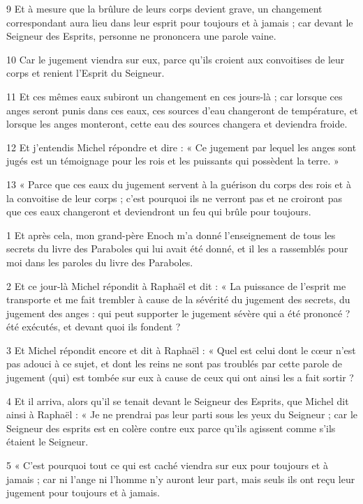 \par 9 Et à mesure que la brûlure de leurs corps devient grave, un changement correspondant aura lieu dans leur esprit pour toujours et à jamais ; car devant le Seigneur des Esprits, personne ne prononcera une parole vaine.
\par 10 Car le jugement viendra sur eux, parce qu'ils croient aux convoitises de leur corps et renient l'Esprit du Seigneur.
\par 11 Et ces mêmes eaux subiront un changement en ces jours-là ; car lorsque ces anges seront punis dans ces eaux, ces sources d'eau changeront de température, et lorsque les anges monteront, cette eau des sources changera et deviendra froide.
\par 12 Et j'entendis Michel répondre et dire : « Ce jugement par lequel les anges sont jugés est un témoignage pour les rois et les puissants qui possèdent la terre. »
\par 13 « Parce que ces eaux du jugement servent à la guérison du corps des rois et à la convoitise de leur corps ; c’est pourquoi ils ne verront pas et ne croiront pas que ces eaux changeront et deviendront un feu qui brûle pour toujours.


\par 1 Et après cela, mon grand-père Enoch m'a donné l'enseignement de tous les secrets du livre des Paraboles qui lui avait été donné, et il les a rassemblés pour moi dans les paroles du livre des Paraboles.
\par 2 Et ce jour-là Michel répondit à Raphaël et dit : « La puissance de l'esprit me transporte et me fait trembler à cause de la sévérité du jugement des secrets, du jugement des anges : qui peut supporter le jugement sévère qui a été prononcé ? été exécutés, et devant quoi ils fondent ?
\par 3 Et Michel répondit encore et dit à Raphaël : « Quel est celui dont le cœur n'est pas adouci à ce sujet, et dont les reins ne sont pas troublés par cette parole de jugement (qui) est tombée sur eux à cause de ceux qui ont ainsi les a fait sortir ?
\par 4 Et il arriva, alors qu'il se tenait devant le Seigneur des Esprits, que Michel dit ainsi à Raphaël : « Je ne prendrai pas leur parti sous les yeux du Seigneur ; car le Seigneur des esprits est en colère contre eux parce qu'ils agissent comme s'ils étaient le Seigneur.
\par 5 « C'est pourquoi tout ce qui est caché viendra sur eux pour toujours et à jamais ; car ni l'ange ni l'homme n'y auront leur part, mais seuls ils ont reçu leur jugement pour toujours et à jamais.

